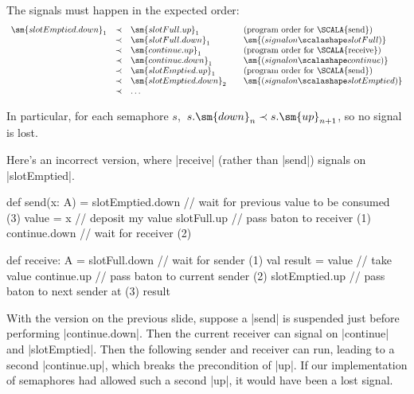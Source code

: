 
\begin{slide}

The signals must happen in the expected order:
\[
\begin{array}{rcl@{\qquad}l}
\sm{slotEmptied.down}_1 & \prec & \sm{slotFull.up}_1 & 
  \mbox{(program order for \SCALA{send})} \\
  & \prec & \sm{slotFull.down}_1 & \sm{(signal on {\scalashape slotFull})} \\
  & \prec & \sm{continue.up}_1 & \mbox{(program order for \SCALA{receive})} \\
  & \prec & \sm{continue.down}_1 & \sm{(signal on {\scalashape continue})} \\
  & \prec & \sm{slotEmptied.up}_1 & \mbox{(program order for \SCALA{send})} \\
  & \prec & \sm{slotEmptied.down}_2 & 
     \sm{(signal on {\scalashape slotEmptied})} \\
  & \prec & \ldots
\end{array}
\]

In particular, for each semaphore $s$,\, $s.\sm{down}_n \prec
s.\sm{up}_{n+1}$, so no signal is lost.
\end{slide}


\begin{slide}

Here's an incorrect version, where |receive| (rather than |send|) signals on
|slotEmptied|. 
%
\begin{scala}
  def send(x: A) = {
    slotEmptied.down       // wait for previous value to be consumed (3)
    value = x               // deposit my value
    slotFull.up             // pass baton to receiver (1)
    continue.down           // wait for receiver (2)
  }

  def receive: A = {
    slotFull.down           // wait for sender (1)
    val result = value      // take value
    continue.up             // pass baton to current sender (2)
    slotEmptied.up          // pass baton to next sender at (3)
    result
  }
\end{scala}
\end{slide}


\begin{slide}

With the version on the previous slide, suppose a |send| is suspended just
before performing |continue.down|.  Then the current receiver can signal on
|continue| and |slotEmptied|.  Then the following sender and receiver can run,
leading to a second |continue.up|, which breaks the precondition of |up|.  If
our implementation of semaphores had allowed such a second |up|, it would have
been a lost signal.
\end{slide}

